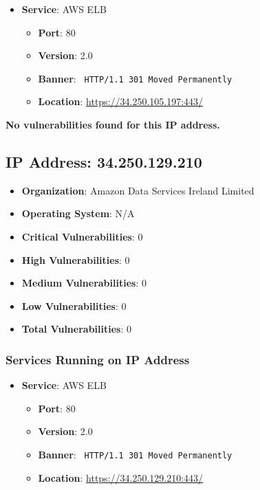 \documentclass{article}
\begin{document}
\begin{itemize}
    
        \item \textbf{Service}: AWS ELB
        \begin{itemize}
            \item \textbf{Port}: 80
            \item \textbf{Version}:  2.0 
            \item \textbf{Banner}: \texttt{ HTTP/1.1 301 Moved Permanently
 }
            \item \textbf{Location}: \href{ https://34.250.105.197:443/ }{ https://34.250.105.197:443/ }
        \end{itemize}
    
\end{itemize}


\textbf{No vulnerabilities found for this IP address.}


\clearpage



\subsection*{IP Address: 34.250.129.210}

\begin{itemize}
    \item \textbf{Organization}: Amazon Data Services Ireland Limited
    \item \textbf{Operating System}:  N/A 
    \item \textbf{Critical Vulnerabilities}: 0
    \item \textbf{High Vulnerabilities}: 0
    \item \textbf{Medium Vulnerabilities}: 0
    \item \textbf{Low Vulnerabilities}: 0
    \item \textbf{Total Vulnerabilities}: 0
\end{itemize}

\subsubsection*{Services Running on IP Address}

\begin{itemize}
    
        \item \textbf{Service}: AWS ELB
        \begin{itemize}
            \item \textbf{Port}: 80
            \item \textbf{Version}:  2.0 
            \item \textbf{Banner}: \texttt{ HTTP/1.1 301 Moved Permanently
 }
            \item \textbf{Location}: \href{ https://34.250.129.210:443/ }{ https://34.250.129.210:443/ }
        \end{itemize}
    
\end{itemize}
\end{document}
